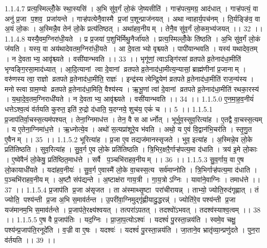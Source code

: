 1.1.4.7
प्रत्य॒स्मिल्लोँ॒के स्था॒स्यसि॑ । अ॒भि सु॑व॒र्गं लो॒कं जे॒ष्यसीति॑ । गाऱ्ह॑पत्य॒मग्र॒ आद॑धात् । गाऱ्ह॑पत्यं॒ वा अनु॑ प्र॒जा प॒शव॒ प्रजा॑यन्ते । गाऱ्ह॑पत्येनै॒वास्मै प्र॒जां प॒शून्प्राज॑नयत् । अथान्वाहार्य॒पच॑नम् । ति॒र्यङ्ङि॑व॒ वा अ॒यं लो॒कः । अ॒स्मिन्नै॒व तेन॑ लो॒के प्रत्य॑तिष्ठत् । अथा॑हव॒नीयम् । तेनै॒व सु॑व॒र्गं लो॒कम॒भ्य॑जयत् ।। 32 ।।
1.1.4.8
यस्यै॒वम॒ग्निरा॑धी॒यते । प्र प्र॒जया॑ प॒शुभि॑र्मिथु॒नैर्जा॑यते । प्रत्य॒स्मिल्लोँ॒के ति॑ष्ठति । अ॒भि सु॑व॒र्गं लो॒कं ज॑यति । यस्य॒ वा अय॑थादेवतम॒ग्निरा॑धी॒यते । आ दे॒वताभ्यो वृश्च्यते । पापी॑यान्भवति । यस्य॑ यथादेव॒तम् । न दे॒वताभ्य॒ आवृ॑श्च्यते । वसी॑यान्भवति ।। 33 ।। भृगू॑णां॒ त्वाऽङ्गि॑रसां व्रतपते व्र॒तेनाद॑धा॒मीति॑ भृग्वङ्गि॒रसा॒माद॑ध्यात् । आ॒दि॒त्यानां त्वा दे॒वानां व्रतपते व्र॒तेनाद॑धा॒मीत्य॒न्यासां॒ ब्राह्म॑णीनां प्र॒जानाम् । वरु॑णस्य त्वा॒ राज्ञो व्रतपते व्र॒तेनाद॑धा॒मीति॒ राज्ञः॑ । इन्द्र॑स्य त्वेन्द्रि॒येण॑ व्रतपते व्र॒तेनाद॑धा॒मीति॑ राज॒न्य॑स्य । मनोस्त्वा ग्राम॒ण्यो व्रतपते व्र॒तेनाद॑धा॒मिति॒ वैश्य॑स्य । ऋ॒भू॒णां त्वा॑ दे॒वानां व्रतपते व्र॒तेनाद॑धा॒मीति॑ रथका॒रस्य॑ । य॒था॒दे॒व॒तम॒ग्निराधी॑यते । न दे॒वताभ्य॒ आवृ॑श्च्यते । वसी॑यान्भवति ।। 34 ।।
1.1.5.0
ए॒न॒मा॒ह॒व॒नीयं॑ धत्तेऽश्व॒त्वं व॑र्तयति कुरुत॒ इति॑ रु॒द्रो द॑धाति॒ य॒दग्नये॒ शुच॑य॒ एकं॑ च ।। 5 ।।
1.1.5.1
प्र॒जाप॑तिर्वा॒चस्स॒त्यम॑पश्यत् । तेना॒ग्निमाध॑त्त । तेन॒ वै स आर्ध्नोत् । भूर्भुव॒स्सुव॒रित्या॑ह । ए॒तद्वै वा॒चस्स॒त्यम् । य ए॒तेना॒ग्निमा॑ध॒त्ते । ऋ॒ध्नोत्ये॒व । अथो॑ स॒त्यप्रा॑शूरे॒व भ॑वति । अथो॒ य ए॒वं वि॒द्वान॑भि॒चर॑ति । स्तृ॒णु॒त ए॒वैनम् ।। 35 ।।
1.1.5.2
भूरित्या॑ह । प्र॒जा ए॒व तद्यज॑मानस्सृजते । भुव॒ इत्या॑ह । अ॒स्मिन्ने॒व लो॒के प्रति॑तिष्ठति । सुव॒रित्या॑ह । सु॒व॒र्ग ए॒व लो॒के प्रति॑तिष्ठति । त्रि॒भिर॒क्षरै॒र्गाऱ्ह॑पत्य॒मा द॑धाति । त्रय॑ इ॒मे लो॒काः । ए॒ष्वे॑वैनं॑ लो॒केषु॒ प्रति॑ष्ठित॒माध॑त्ते । सर्वै प॒ञ्चभि॑राहव॒नीयम् ।। 36 ।।
1.1.5.3
सु॒व॒र्गाय॒ वा ए॒ष लो॒कायाधी॑यते । यदा॑हव॒नीयः॑ । सु॒व॒र्ग ए॒वास्मै॑ लो॒के वा॒चस्स॒त्य सर्व॑माप्नोति । त्रि॒भिर्गाऱ्ह॑पत्य॒मा द॑धाति । प॒ञ्चभि॑राहव॒नीयम् । अ॒ष्टौ संप॑द्यन्ते । अ॒ष्टाक्ष॑रा गाय॒त्री । गा॒य॒त्रोऽग्निः । यावा॑ने॒वाग्निः । तमाध॑त्ते ।। 37 ।।
1.1.5.4
प्र॒जाप॑ति प्र॒जा अ॑सृजत । ता अ॑स्माथ्सृ॒ष्टा परा॑चीरायन्न् । ताभ्यो॒ ज्योति॒रुद॑गृह्णात् । तं ज्योति॒ पश्य॑न्ती प्र॒जा अ॒भि स॒माव॑र्तन्त । उ॒परी॑वा॒ग्निमुद्गृ॑ह्णीयादु॒द्धरन्न्॑ । ज्योति॑रे॒व पश्य॑न्ती प्र॒जा यज॑मानम॒भि स॒माव॑र्तन्ते । प्र॒जाप॑ते॒रक्ष्य॑श्वयत् । तत्परा॑ऽपतत् । तदश्वो॑ऽभवत् । तदश्व॑स्याश्व॒त्वम् ।। 38 ।।
1.1.5.5
ए॒ष वै प्र॒जाप॑तिः । यद॒ग्निः । प्रा॒जा॒प॒त्योऽश्वः॑ । यदश्वं॑ पु॒रस्ता॒न्नय॑ति । स्वमे॒व चक्षु॒ पश्य॑न्प्र॒जाप॑ति॒रनूदे॑ति । व॒ज्री वा ए॒षः । यदश्वः॑ । यदश्वं॑ पु॒रस्ता॒न्नय॑ति । जा॒ताने॒व भ्रातृ॑व्या॒न्प्रणु॑दते । पुन॒रा व॑र्तयति ।। 39 ।।
